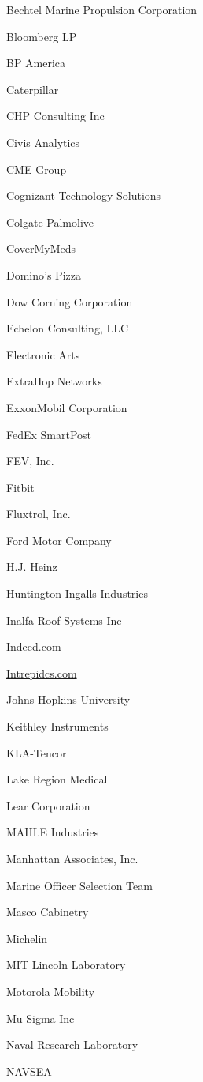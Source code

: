 \documentclass[twoside]{article}
\begin{document}
\begin{center}
\begin{multicols}{5}
\begin{FlushLeft}
\begin{compactitem}
\item Bechtel Marine Propulsion Corporation
\item Bloomberg LP
\item BP America
\item Caterpillar
\item CHP Consulting Inc
\item Civis Analytics
\item CME Group
\item Cognizant Technology Solutions
\item Colgate-Palmolive
\item CoverMyMeds
\item Domino's Pizza
\item Dow Corning Corporation
\item Echelon Consulting, LLC
\item Electronic Arts
\item ExtraHop Networks
\item ExxonMobil Corporation
\item FedEx SmartPost
\item FEV, Inc.
\item Fitbit
\item Fluxtrol, Inc.
\item Ford Motor Company
\item H.J. Heinz
\item Huntington Ingalls Industries
\item Inalfa Roof Systems Inc
\item \url{Indeed.com}
\item \url{Intrepidcs.com}
\item Johns Hopkins University
\item Keithley Instruments
\item KLA-Tencor
\item Lake Region Medical
\item Lear Corporation
\item MAHLE Industries
\item Manhattan Associates, Inc.
\item Marine Officer Selection Team
\item Masco Cabinetry
\item Michelin
\item MIT Lincoln Laboratory
\item Motorola Mobility
\item Mu Sigma Inc
\item Naval Research Laboratory
\item NAVSEA

\end{compactitem}
\end{FlushLeft}
\end{multicols}
\end{center}
\end{document}
